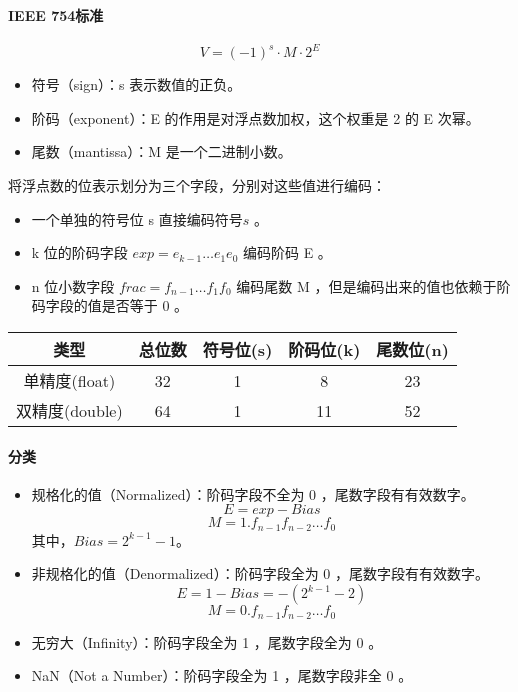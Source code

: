\paragraph{IEEE 754标准}
$$V = (-1)^{s} \cdot M \cdot 2^E$$
\begin{itemize}
    \item 符号（sign）：s 表示数值的正负。
    \item 阶码（exponent）：E 的作用是对浮点数加权，这个权重是 2 的 E 次幂。
    \item 尾数（mantissa）：M 是一个二进制小数。
\end{itemize}
将浮点数的位表示划分为三个字段，分别对这些值进行编码：
\begin{itemize}
    \item 一个单独的符号位 s 直接编码符号$s$ 。
    \item k 位的阶码字段 $exp=e_{k-1}\ldots e_1e_0$ 编码阶码 E 。
    \item n 位小数字段 $frac=f_{n-1}\ldots f_1f_0$ 编码尾数 M ，但是编码出来的值也依赖于阶码字段的值是否等于 0 。
\end{itemize}
\begin{table}[htbp]
    \centering
    \begin{tabular}{|c|c|c|c|c|}
        \hline
        类型          & 总位数 & 符号位(s) & 阶码位(k) & 尾数位(n) \\
        \hline
        单精度(float)  & 32  & 1      & 8      & 23     \\
        \hline
        双精度(double) & 64  & 1      & 11     & 52     \\
        \hline
    \end{tabular}
\end{table}

\paragraph{分类}
\begin{itemize}
    \item 规格化的值（Normalized）：阶码字段不全为 0 ，尾数字段有有效数字。
          $$E=exp - Bias$$
          $$M=1.f_{n-1}f_{n-2}\ldots f_0$$
          其中，$Bias = 2^{k-1} - 1$。
    \item 非规格化的值（Denormalized）：阶码字段全为 0 ，尾数字段有有效数字。
          $$E = 1 - Bias = - (2^{k-1} - 2)$$
          $$M = 0.f_{n-1}f_{n-2}\ldots f_0$$
    \item 无穷大（Infinity）：阶码字段全为 1 ，尾数字段全为 0 。
    \item NaN（Not a Number）：阶码字段全为 1 ，尾数字段非全 0 。
\end{itemize}

